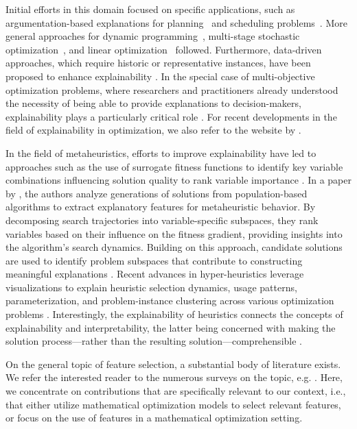 \documentclass[11pt, a4paper]{article}
\begin{document}
Initial efforts in this domain focused on specific applications, such as argumentation-based explanations for planning~\citep{collins2019towards, oren2020argument} and scheduling problems~\citep{vcyras2019argumentation, vcyras2021schedule}. More general approaches for dynamic programming~\citep{erwig2021explainable}, multi-stage stochastic optimization~\citep{tierney2022explaining}, and linear optimization~\citep{kurtz2024counterfactual} followed. Furthermore, data-driven approaches, which require historic or representative instances, have been proposed to enhance explainability \citep{aigner2024framework,forel2023explainable}. In the special case of multi-objective optimization problems, where researchers and practitioners already understood the necessity of being able to provide explanations to decision-makers, explainability plays a particularly critical role \citep{sukkerd2018toward, misitano2022towards, corrente2024explainable}. For recent developments in the field of explainability in optimization, we also refer to the website by \cite{expopt}.

In the field of metaheuristics, efforts to improve explainability have led to approaches such as the use of surrogate fitness functions to identify key variable combinations influencing solution quality to rank variable importance \citep{wallace2021towards}.
In a paper by \cite{fyvie2023explaining}, the authors analyze generations of solutions from population-based algorithms to extract explanatory features for metaheuristic behavior. By decomposing search trajectories into variable-specific subspaces, they rank variables based on their influence on the fitness gradient, providing insights into the algorithm’s search dynamics. Building on this approach, candidate solutions are used to identify problem subspaces that contribute to constructing meaningful explanations \citep{10.1007/978-3-031-77918-3_13}. Recent advances in hyper-heuristics leverage visualizations to explain heuristic selection dynamics, usage patterns, parameterization, and problem-instance clustering across various optimization problems \citep{yates2024explainable}. Interestingly, the explainability of heuristics connects the concepts of explainability and interpretability, the latter being concerned with making the solution process—rather than the resulting solution—comprehensible \citep{rudin2019stop,GOERIGK2023Interpretable}.

On the general topic of feature selection, a substantial body of literature exists. We refer the interested reader to the numerous surveys on the topic, e.g.  \cite{li2017feature,rong2019feature,dhal2022comprehensive}.
Here, we concentrate on contributions that are specifically relevant to our context, i.e., that either utilize mathematical optimization models to select relevant features, or focus on the use of features in a mathematical optimization setting. 
\end{document}
